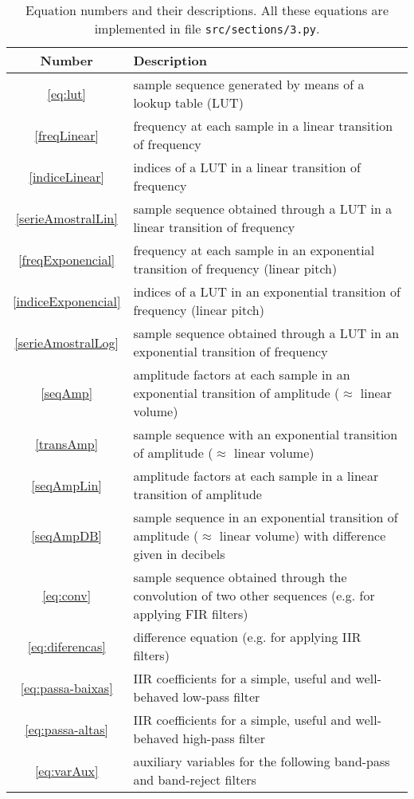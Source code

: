 \documentclass{scrreprt}
\newcommand*{\reff}[1]{%
	{\NoHyper\ref{#1}\endNoHyper}%
	  }
\begin{document}
\begin{table*}[htp!]
\centering
\caption{Equation numbers and their descriptions.
All these equations are implemented in file \texttt{src/sections/3.py}.}
\begin{tabular}{ c | p{12cm} }
   Number & Description \\\hline
 \reff{eq:lut} & sample sequence generated by means of a lookup table (LUT) \\
 \reff{freqLinear} & frequency at each sample in a linear transition of frequency \\
 \reff{indiceLinear} & indices of a LUT in a linear transition of frequency \\
 \reff{serieAmostralLin} & sample sequence obtained through a LUT in a linear transition of frequency \\
 \reff{freqExponencial} & frequency at each sample in an exponential transition of frequency (linear pitch) \\
 \reff{indiceExponencial} & indices of a LUT in an exponential transition of frequency (linear pitch) \\
 \reff{serieAmostralLog} & sample sequence obtained through a LUT in an exponential transition of frequency \\
 \reff{seqAmp} & amplitude factors at each sample in an exponential transition of amplitude ($\approx$ linear volume) \\
 \reff{transAmp} & sample sequence with an exponential transition of amplitude ($\approx$ linear volume) \\
 \reff{seqAmpLin} & amplitude factors at each sample in a linear transition of amplitude \\
 \reff{seqAmpDB} & sample sequence in an exponential transition of amplitude ($\approx$ linear volume) with difference given in decibels \\
 \reff{eq:conv} & sample sequence obtained through the convolution of two other sequences (e.g. for applying FIR filters) \\
 \reff{eq:diferencas} & difference equation (e.g. for applying IIR filters) \\
 \reff{eq:passa-baixas} & IIR coefficients for a simple, useful and well-behaved low-pass filter \\
 \reff{eq:passa-altas} & IIR coefficients for a simple, useful and well-behaved high-pass filter \\
 \reff{eq:varAux} & auxiliary variables for the following band-pass and band-reject filters \\

\end{tabular}
\end{table*}
\end{document}
